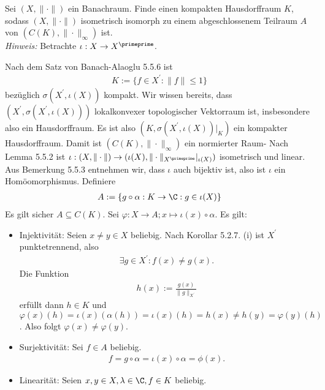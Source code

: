 \begin{exercise}
Sei $(X,\|\cdot\|)$ ein Banachraum. Finde einen kompakten Hausdorffraum $K$, sodass
$(X,\|\cdot\|)$ isometrisch isomorph zu einem abgeschlossenem Teilraum $A$ von
$(C(K),\|\cdot\|_{\infty})$ ist. \\
\textit{Hinweis:} Betrachte $\iota: X \to X^{\primeprime}$.
\end{exercise}
\begin{solution}
Nach dem Satz von Banach-Alaoglu 5.5.6 ist
\begin{align*}
  K := \{f \in X^{\prime}: \|f\| \leq 1\}
\end{align*}
bezüglich $\sigma(X^{\prime}, \iota(X))$ kompakt.
Wir wissen bereits, dass $(X^{\prime}, \sigma(X^{\prime},\iota(X)))$ lokalkonvexer
topologischer Vektorraum ist, insbesondere also ein Hausdorffraum.
Es ist also $(K, \sigma(X^{\prime},\iota(X))|_K)$ ein kompakter Hausdorffraum.
Damit ist $(C(K), \|\cdot\|_{\infty})$ ein normierter Raum-
Nach Lemma 5.5.2 ist $\iota: (X,\|\cdot\|) \to (\iota(X),\|\cdot\|_{X^{\primeprime}}|_{\iota(X)})$
isometrisch und linear.
Aus Bemerkung 5.5.3 entnehmen wir, dass $\iota$ auch bijektiv ist, also ist $\iota$
ein Homöomorphismus.
Definiere
\begin{align*}
  A := \{g\circ\alpha: K \to \C: g \in \iota(X)\}
\end{align*}
Es gilt sicher $A \subseteq C(K)$.
Sei $\varphi: X \to A; x \mapsto \iota(x) \circ \alpha$.
Es gilt:
\begin{itemize}
  \item Injektivität: Seien $x \neq y \in X$ beliebig. Nach Korollar 5.2.7. (i)
  ist $X^{\prime}$ punktetrennend, also
  \begin{align*}
    \exists g \in X^{\prime}: f(x) \neq g(x).
  \end{align*}
  Die Funktion
  \begin{align*}
    h(x) := \frac{g(x)}{\|g\|_{X^{\prime}}}
  \end{align*}
  erfüllt dann $h \in K$ und $\varphi(x)(h) = \iota(x)(\alpha(h)) = \iota(x)(h) = h(x) \neq h(y) = \varphi(y)(h)$.
  Also folgt $\varphi(x) \neq \varphi(y)$.
  \item Surjektivität: Sei $f \in A$ beliebig. \\
  \begin{align*}
    f = g \circ \alpha = \iota(x) \circ \alpha = \phi(x).
  \end{align*}
  \item Linearität: Seien $x,y \in X, \lambda \in \C, f \in K$ beliebig.

\end{itemize}
\end{solution}
